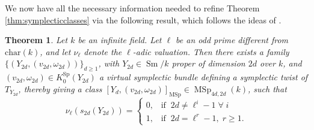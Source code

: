\documentclass[10pt]{amsart}
\theoremstyle{definition}
\theoremstyle{plain}
\newtheorem{thm}[defn]{Theorem}
\numberwithin{equation}{section}
\newcommand{\0}{\emptyset}
\newcommand{\MSp}{{\operatorname{MSp}}}
\newcommand{\Sp}{{\operatorname{Sp}}}
\newcommand{\Sm}{{\operatorname{Sm}}}
\begin{document}
We now have all the necessary information needed to refine Theorem \ref{thm:symplecticclasses} via the following result, which follows the ideas of \cite[Section 4]{Stong-cobordism}.

\begin{thm}
\label{thm:symplclasses2} Let $k$ be an infinite field.
    Let $\ell$ be an odd prime different from $\text{char}(k)$, and let $\nu_{\ell}$ denote the $\ell$-adic valuation. Then there exists a family $\{(Y_{2d}, (v_{2d}, \omega_{2d}))\}_{d \ge1}$, with $Y_{2d}\in \Sm/k$ proper of dimension $2d$ over $k$, and $(v_{2d}, \omega_{2d})\in K_0^\Sp(Y_{2d})$ a virtual symplectic bundle defining a symplectic twist of $T_{Y_{2d}}$, thereby giving  a class $[Y_d,(v_{2d}, \omega_{2d})]_{\MSp} \in \MSp_{4d,2d}(k)$, such that
    $$\nu_{\ell}(s_{2d}(Y_{2d}))=
    \begin{cases}
        0, \; \; \; \text{if} \;\;  2d \neq \ell^i-1 \; \forall \; i \\
        1, \; \; \; \text{if} \; \; 2d=\ell^r -1, \; r \ge 1.
    \end{cases}$$
\end{thm}
\end{document}
